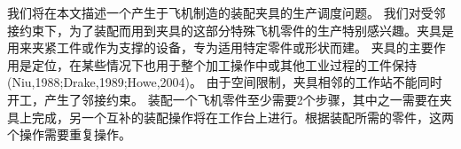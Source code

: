 我们将在本文描述一个产生于飞机制造的装配夹具的生产调度问题。
我们对受邻接约束下，为了装配而用到夹具的这部分特殊飞机零件的生产特别感兴趣。夹具是用来夹紧工件或作为支撑的设备，专为适用特定零件或形状而建。
夹具的主要作用是定位，在某些情况下也用于整个加工操作中或其他工业过程的工件保持(Niu,1988;Drake,1989;Howe,2004)。
由于空间限制，夹具相邻的工作站不能同时开工，产生了邻接约束。
装配一个飞机零件至少需要2个步骤，其中之一需要在夹具上完成，另一个互补的装配操作将在工作台上进行。根据装配所需的零件，这两个操作需要重复操作。

